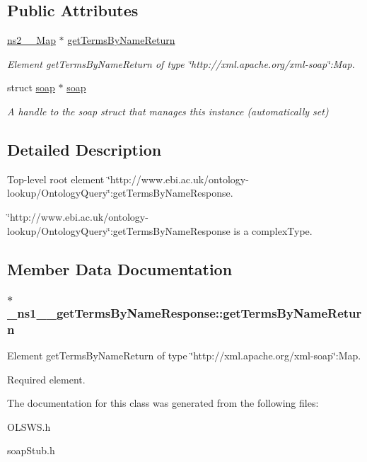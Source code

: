 \subsection*{Public Attributes}
\begin{DoxyCompactItemize}
\item 
\hyperlink{classns2____Map}{ns2\_\-\_\-Map} $\ast$ \hyperlink{class__ns1____getTermsByNameResponse_a724711b0771e1549db46284989632ec2}{getTermsByNameReturn}
\begin{DoxyCompactList}\small\item\em Element getTermsByNameReturn of type \char`\"{}http://xml.apache.org/xml-\/soap\char`\"{}:Map. \end{DoxyCompactList}\item 
\hypertarget{class__ns1____getTermsByNameResponse_a46f61f840f2d12601f04a595c1ff5d6f}{
struct \hyperlink{class__ns1____getTermsByNameResponse_a46f61f840f2d12601f04a595c1ff5d6f}{soap} $\ast$ \hyperlink{class__ns1____getTermsByNameResponse_a46f61f840f2d12601f04a595c1ff5d6f}{soap}}
\label{class__ns1____getTermsByNameResponse_a46f61f840f2d12601f04a595c1ff5d6f}

\begin{DoxyCompactList}\small\item\em A handle to the soap struct that manages this instance (automatically set) \end{DoxyCompactList}\end{DoxyCompactItemize}


\subsection{Detailed Description}
Top-\/level root element \char`\"{}http://www.ebi.ac.uk/ontology-\/lookup/OntologyQuery\char`\"{}:getTermsByNameResponse. 

\char`\"{}http://www.ebi.ac.uk/ontology-\/lookup/OntologyQuery\char`\"{}:getTermsByNameResponse is a complexType. 

\subsection{Member Data Documentation}
\hypertarget{class__ns1____getTermsByNameResponse_a724711b0771e1549db46284989632ec2}{
\subsubsection[{getTermsByNameReturn}]{ $\ast$ {\bf \_\-ns1\_\-\_\-getTermsByNameResponse::getTermsByNameReturn}}}
\label{class__ns1____getTermsByNameResponse_a724711b0771e1549db46284989632ec2}


Element getTermsByNameReturn of type \char`\"{}http://xml.apache.org/xml-\/soap\char`\"{}:Map. 

Required element. 

The documentation for this class was generated from the following files:\begin{DoxyCompactItemize}
\item 
OLSWS.h\item 
soapStub.h\end{DoxyCompactItemize}
